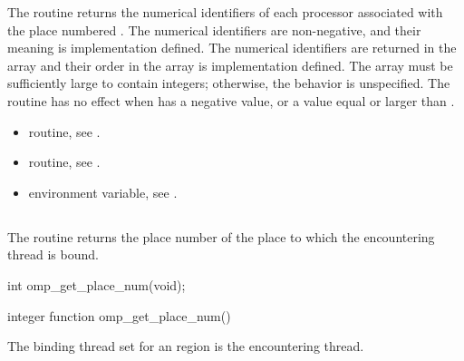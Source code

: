 \effect
The  routine returns the numerical 
identifiers of each processor associated with the place numbered 
. The numerical identifiers are non-negative, and 
their meaning is implementation defined.  The numerical identifiers 
are returned in the array  and their order in the array is 
implementation defined. The array must be sufficiently large to contain 
\code{)} integers; 
otherwise, the behavior is unspecified.  The routine has no effect when 
 has a negative value, or a value equal or larger 
than .

\crossreferences
\begin{itemize}
\item {} routine, see 
.

\item {} routine, see 
.

\item {} environment variable, see 
.
\end{itemize}




\subsection{}
\label{subsec:omp_get_place_num}

\summary
The  routine returns the place number of the place to which the encountering thread is bound.

\format
\begin{ccppspecific}
\begin{ompcFunction}
int omp_get_place_num(void);
\end{ompcFunction}
\end{ccppspecific}

\begin{fortranspecific}
\begin{ompfFunction}
integer function omp_get_place_num()
\end{ompfFunction}
\end{fortranspecific}

\binding
The binding thread set for an  region is the encountering thread.

